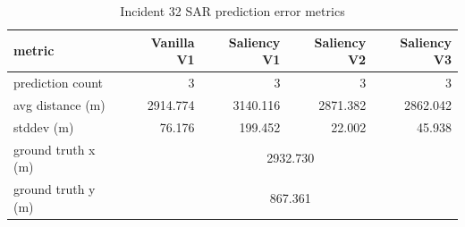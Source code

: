 \begin{table}[ht]
\centering
\caption{Incident 32 SAR prediction error metrics}
\label{tab:sar-incident-32}
\begin{tabular}{lrrrr}
\hline
metric & Vanilla V1 & Saliency V1 & Saliency V2 & Saliency V3 \\
\hline
prediction count & 3 & 3 & 3 & 3 \\
avg distance (m) & 2914.774 & 3140.116 & 2871.382 & 2862.042 \\
stddev (m) & 76.176 & 199.452 & 22.002 & 45.938 \\
ground truth x (m) & \multicolumn{4}{c}{2932.730} \\
ground truth y (m) & \multicolumn{4}{c}{867.361} \\
\hline
\end{tabular}
\end{table}
